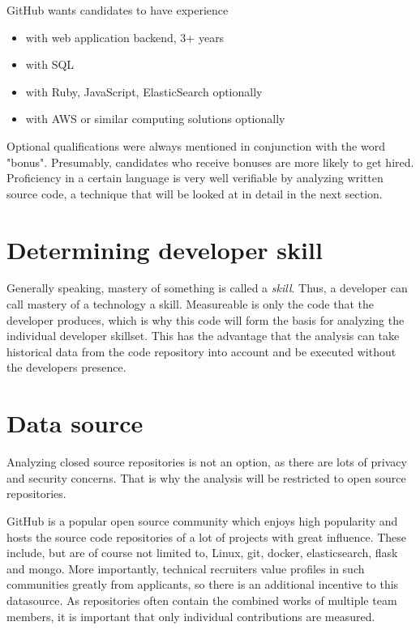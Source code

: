 GitHub wants candidates to have experience
\begin{itemize}
    \item with web application backend, 3+ years
    \item with SQL
    \item with Ruby, JavaScript, ElasticSearch optionally
    \item with AWS or similar computing solutions optionally
\end{itemize}

Optional qualifications were always mentioned in conjunction with the
word "bonus". Presumably, candidates who receive bonuses are more
likely to get hired. Proficiency in a certain language is very well
verifiable by analyzing written source code, a technique that will
be looked at in detail in the next section.

\section{Determining developer skill}
Generally speaking, mastery of something is called a \textit{skill}.
Thus, a developer can call mastery of a technology a skill.
Measureable is only the code that the developer produces, which
is why this code will form the basis for analyzing the individual
developer skillset. This has the advantage that the analysis
can take historical data from the code repository into account
and be executed without the developers presence.

\section{Data source}
Analyzing closed source repositories is not an option, as there are lots
of privacy and security concerns. That is why the analysis will be
restricted to open source repositories.
\newline

GitHub is a popular open source community which enjoys high popularity
and hosts the source code repositories of a lot of projects with great influence.
These include, but are of course not limited to,
Linux, git, docker, elasticsearch, flask and mongo\cite{rpfd:2014}.
More importantly, technical recruiters value profiles in such communities
greatly from applicants\cite{md:2013}, so there is an additional
incentive to this datasource. As repositories
often contain the combined works of multiple team members,
it is important that only individual contributions are measured.

